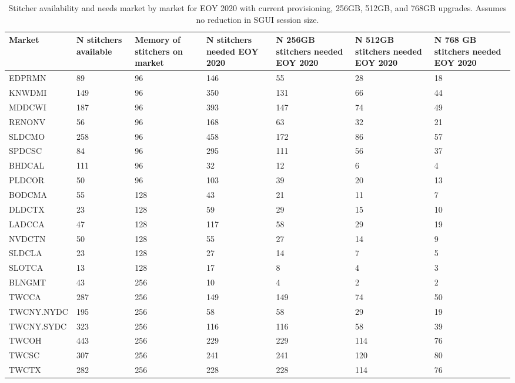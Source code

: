 \documentclass{article}
\begin{document}
\begin{table}
\begin{tabular}{|l|p{16mm}|p{16mm}|p{16mm}|p{16mm}|p{16mm}|p{16mm}|} 
\hline Market & N stitchers available & Memory of stitchers on market & N stitchers needed EOY 2020 & N 256GB stitchers needed EOY 2020 & N 512GB stitchers needed EOY 2020 & N 768 GB stitchers needed EOY 2020 \\
\hline EDPRMN & 89 & 96 & 146 & 55 & 28 & 18 \\
\hline KNWDMI & 149 & 96 & 350 & 131 & 66 & 44 \\
\hline MDDCWI & 187 & 96 & 393 & 147 & 74 & 49 \\
\hline RENONV & 56 & 96 & 168 & 63 & 32 & 21 \\
\hline SLDCMO & 258 & 96 & 458 & 172 & 86 & 57 \\
\hline SPDCSC & 84 & 96 & 295 & 111 & 56 & 37 \\
\hline BHDCAL & 111 & 96 & 32 & 12 & 6 & 4 \\
\hline PLDCOR & 50 & 96 & 103 & 39 & 20 & 13 \\
\hline BODCMA & 55 & 128 & 43 & 21 & 11 & 7 \\
\hline DLDCTX & 23 & 128 & 59 & 29 & 15 & 10 \\
\hline LADCCA & 47 & 128 & 117 & 58 & 29 & 19 \\
\hline NVDCTN & 50 & 128 & 55 & 27 & 14 & 9 \\
\hline SLDCLA & 23 & 128 & 27 & 14 & 7 & 5 \\
\hline SLOTCA & 13 & 128 & 17 & 8 & 4 & 3 \\
\hline BLNGMT & 43 & 256 & 10 & 4 & 2 & 2 \\
\hline TWCCA & 287 & 256 & 149 & 149 & 74 & 50 \\
\hline TWCNY.NYDC & 195 & 256 & 58 & 58 & 29 & 19 \\
\hline TWCNY.SYDC & 323 & 256 & 116 & 116 & 58 & 39 \\
\hline TWCOH & 443 & 256 & 229 & 229 & 114 & 76 \\
\hline TWCSC & 307 & 256 & 241 & 241 & 120 & 80 \\
\hline TWCTX & 282 & 256 & 228 & 228 & 114 & 76 \\
\hline 
\end{tabular}
\caption{\label{TABLE-StitchersNeeded2020}Stitcher availability and needs market by market for EOY 2020 with current provisioning, 256GB, 512GB, and 768GB upgrades. Assumes no reduction in SGUI session size.} 
\end{table}
\end{document}
